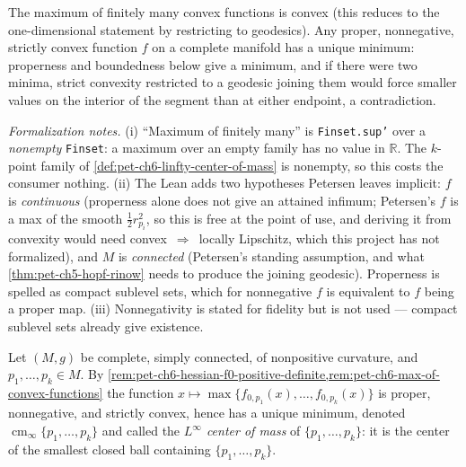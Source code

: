 \begin{remark}
  \label{rem:pet-ch6-max-of-convex-functions}
  \leanok
  The maximum of finitely many convex functions is convex (this reduces to
  the one-dimensional statement by restricting to geodesics). Any proper,
  nonnegative, strictly convex function $f$ on a complete manifold has a
  unique minimum: properness and boundedness below give a minimum, and if
  there were two minima, strict convexity restricted to a geodesic joining
  them would force smaller values on the interior of the segment than at
  either endpoint, a contradiction.

  \emph{Formalization notes.} (i) ``Maximum of finitely many'' is
  \texttt{Finset.sup'} over a \emph{nonempty} \texttt{Finset}: a maximum over
  an empty family has no value in $\mathbb{R}$. The $k$-point family of
  \cref{def:pet-ch6-linfty-center-of-mass} is nonempty, so this costs the
  consumer nothing. (ii) The Lean adds two hypotheses Petersen leaves
  implicit: $f$ is \emph{continuous} (properness alone does not give an
  attained infimum; Petersen's $f$ is a max of the smooth $\tfrac12r_{p_i}^2$,
  so this is free at the point of use, and deriving it from convexity would
  need convex~$\Rightarrow$~locally Lipschitz, which this project has not
  formalized), and $M$ is \emph{connected} (Petersen's standing assumption,
  and what \cref{thm:pet-ch5-hopf-rinow} needs to produce the joining
  geodesic). Properness is spelled as compact sublevel sets, which for
  nonnegative $f$ is equivalent to $f$ being a proper map. (iii)
  Nonnegativity is stated for fidelity but is not used --- compact sublevel
  sets already give existence.
\end{remark}

\begin{definition}
  \label{def:pet-ch6-linfty-center-of-mass}
  Let $(M,g)$ be complete, simply connected, of nonpositive curvature, and
  $p_1,\dots,p_k\in M$. By
  \cref{rem:pet-ch6-hessian-f0-positive-definite,rem:pet-ch6-max-of-convex-functions}
  the function $x\mapsto\max\{f_{0,p_1}(x),\dots,f_{0,p_k}(x)\}$ is proper,
  nonnegative, and strictly convex, hence has a unique minimum, denoted
  $\operatorname{cm}_\infty\{p_1,\dots,p_k\}$ and called the \emph{$L^\infty$ center of
  mass} of $\{p_1,\dots,p_k\}$: it is the center of the smallest closed ball
  containing $\{p_1,\dots,p_k\}$.
\end{definition}


